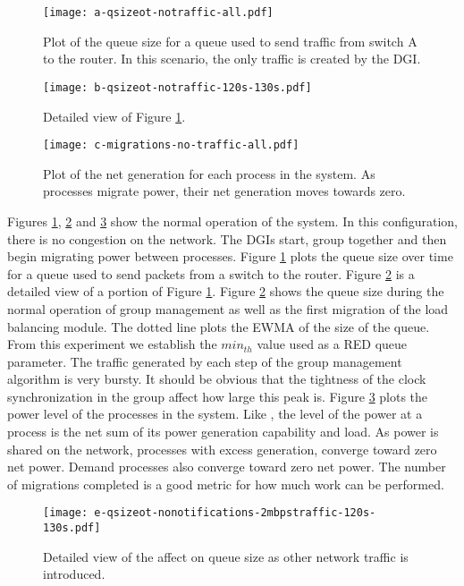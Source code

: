 \begin{figure}
\texttt{[image: a-qsizeot-notraffic-all.pdf]}
\caption{Plot of the queue size for a queue used to send traffic from switch A to the router. In this scenario, the only traffic is created by the \ac{DGI}.}
\label{fig:plota}
\end{figure}

\begin{figure}
\texttt{[image: b-qsizeot-notraffic-120s-130s.pdf]}
\caption{Detailed view of Figure \ref{fig:plota}.}
\label{fig:plotb}
\end{figure}

\begin{figure}
\texttt{[image: c-migrations-no-traffic-all.pdf]}
\caption{Plot of the net generation for each process in the system. As processes migrate power, their net generation moves towards zero.}
\label{fig:plotc}
\end{figure}

Figures \ref{fig:plota}, \ref{fig:plotb} and \ref{fig:plotc} show the normal operation of the system.
In this configuration, there is no congestion on the network. 
The \ac{DGI}s start, group together and then begin migrating power between processes.
Figure \ref{fig:plota} plots the queue size over time for a queue used to send packets from a switch to the router.
Figure \ref{fig:plotb} is a detailed view of a portion of Figure \ref{fig:plota}.
Figure \ref{fig:plotb} shows the queue size during the normal operation of group management as well as the first migration of the load balancing module.
The dotted line plots the \ac{EWMA} of the size of the queue.
From this experiment we establish the $min_{th}$ value used as a \ac{RED} queue parameter.
The traffic generated by each step of the group management algorithm is very bursty.
It should be obvious that the tightness of the clock synchronization in the group affect how large this peak is.
Figure \ref{fig:plotc} plots the power level of the processes in the system.
Like \cite{HILTESTBED}, the level of the power at a process is the net sum of its power generation capability and load.
As power is shared on the network, processes with excess generation, converge toward zero net power.
Demand processes also converge toward zero net power.
The number of migrations completed is a good metric for how much work can be performed.

\begin{figure}
\texttt{[image: e-qsizeot-nonotifications-2mbpstraffic-120s-130s.pdf]}
\caption{Detailed view of the affect on queue size as other network traffic is introduced.}
\label{fig:plote}
\end{figure}

